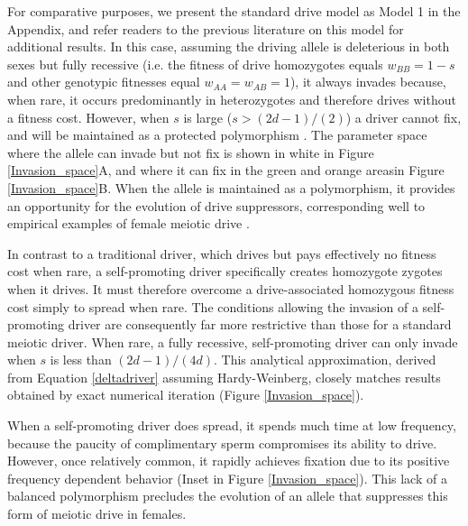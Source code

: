 \documentclass[12pt,letterpaper]{article}
\begin{document}
For comparative purposes, we present the standard drive model as Model 1 in the Appendix, 
	and refer readers to the previous literature on this model \citep[e.g. ][]{Prout1973,Ubeda2004} for additional results. 
In this case, assuming the driving allele is deleterious in both sexes but fully recessive 
	(i.e. the fitness of drive homozygotes equals $w_{BB}=1-s$ and other genotypic fitnesses equal $w_{AA}=w_{AB}=1$), 
	it always invades because,  when rare, it occurs predominantly in heterozygotes and therefore drives without a fitness cost. 
However, when $s$ is large ($s>(2d-1)/(2)$) a driver cannot fix, and
will be maintained as a protected polymorphism \citep{Prout1973}. The
        parameter space where the allele can invade but not fix is shown in white
        in Figure \ref{Invasion_space}A, and where it can fix in the green
        and orange areasin Figure \ref{Invasion_space}B. When the allele is
        maintained as a polymorphism, it provides an opportunity for the evolution of
	drive suppressors, corresponding well to empirical examples of
        female meiotic drive \citep[reviewed in ][]{Burt2006}. 

In contrast to a traditional driver, which drives but pays effectively
	no fitness cost when rare, 
	a self-promoting driver specifically creates homozygote
        zygotes when it drives. %
It must therefore overcome a drive-associated homozygous fitness cost simply to spread when rare. 
The conditions allowing the invasion of a self-promoting driver
 	are consequently far more restrictive than those for a standard meiotic driver.
When rare, a fully recessive, self-promoting driver can only invade when $s$ 
	is less than $(2 d - 1)/(4 d)$. 
This analytical approximation, derived from Equation \eqref{deltadriver} assuming Hardy-Weinberg, 
	closely matches results obtained by exact numerical iteration (Figure \ref{Invasion_space}). 


When a self-promoting driver does spread, 
	it spends much time at low frequency, 
	because the paucity of complimentary sperm compromises its ability to drive. 
However, once relatively common, it  rapidly achieves fixation due to its
	positive frequency dependent behavior (Inset in Figure \ref{Invasion_space}).  
This lack of a balanced polymorphism %
	precludes the evolution of an
	allele that suppresses this form of meiotic drive in females.
\end{document}
